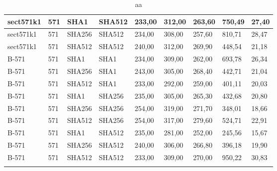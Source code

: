 \begin{longtable}{| l | l | l | l | l |l |l |l |l |}
sect571k1 & 571 & SHA1 & SHA512 & 233,00 & 312,00 & 263,60 & 750,49 & 27,40 \\ \hline 
sect571k1 & 571 & SHA256 & SHA512 & 234,00 & 308,00 & 257,60 & 810,71 & 28,47 \\ \hline 
sect571k1 & 571 & SHA512 & SHA512 & 240,00 & 312,00 & 269,90 & 448,54 & 21,18 \\ \hline 
B-571 & 571 & SHA1 & SHA1 & 234,00 & 309,00 & 262,00 & 693,78 & 26,34 \\ \hline 
B-571 & 571 & SHA256 & SHA1 & 243,00 & 305,00 & 268,40 & 442,71 & 21,04 \\ \hline 
B-571 & 571 & SHA512 & SHA1 & 233,00 & 292,00 & 259,00 & 401,11 & 20,03 \\ \hline 
B-571 & 571 & SHA1 & SHA256 & 235,00 & 305,00 & 265,30 & 432,68 & 20,80 \\ \hline 
B-571 & 571 & SHA256 & SHA256 & 254,00 & 319,00 & 271,70 & 348,01 & 18,66 \\ \hline 
B-571 & 571 & SHA512 & SHA256 & 254,00 & 317,00 & 279,60 & 524,71 & 22,91 \\ \hline 
B-571 & 571 & SHA1 & SHA512 & 235,00 & 281,00 & 252,00 & 245,56 & 15,67 \\ \hline 
B-571 & 571 & SHA256 & SHA512 & 240,00 & 306,00 & 266,80 & 396,18 & 19,90 \\ \hline 
B-571 & 571 & SHA512 & SHA512 & 233,00 & 309,00 & 270,00 & 950,22 & 30,83 \\ \hline 
\caption{aa}
\end{longtable}